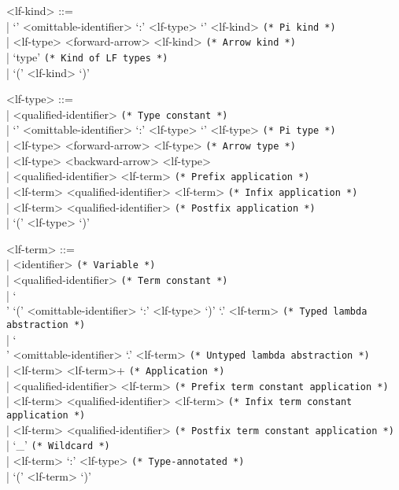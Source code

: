 \documentclass[11pt]{article}
\begin{document}
\begin{grammar}
<lf-kind> ::= \hfill\\
| `{' <omittable-identifier> `:' <lf-type> `}' <lf-kind> \hfill \texttt{(* Pi kind *)}\\
| <lf-type> <forward-arrow> <lf-kind> \hfill \texttt{(* Arrow kind *)}\\
| `type' \hfill \texttt{(* Kind of LF types *)}\\
| `(' <lf-kind> `)'

<lf-type> ::= \hfill\\
| <qualified-identifier> \hfill \texttt{(* Type constant *)}\\
| `{' <omittable-identifier> `:' <lf-type> `}' <lf-type> \hfill \texttt{(* Pi type *)}\\
| <lf-type> <forward-arrow> <lf-type> \hfill \texttt{(* Arrow type *)}\\
| <lf-type> <backward-arrow> <lf-type>\\
| <qualified-identifier> <lf-term> \hfill \texttt{(* Prefix application *)}\\
| <lf-term> <qualified-identifier> <lf-term> \hfill \texttt{(* Infix application *)}\\
| <lf-term> <qualified-identifier> \hfill \texttt{(* Postfix application *)}\\
| `(' <lf-type> `)'

<lf-term> ::= \hfill\\
| <identifier> \hfill \texttt{(* Variable *)}\\
| <qualified-identifier> \hfill \texttt{(* Term constant *)}\\
| `\\' `(' <omittable-identifier> `:' <lf-type> `)' `.' <lf-term> \hfill \texttt{(* Typed lambda abstraction *)}\\
| `\\' <omittable-identifier> `.' <lf-term> \hfill \texttt{(* Untyped lambda abstraction *)}\\
| <lf-term> <lf-term>+ \hfill \texttt{(* Application *)}\\
| <qualified-identifier> <lf-term> \hfill \texttt{(* Prefix term constant application *)}\\
| <lf-term> <qualified-identifier> <lf-term> \hfill \texttt{(* Infix term constant application *)}\\
| <lf-term> <qualified-identifier> \hfill \texttt{(* Postfix term constant application *)}\\
| `_' \hfill \texttt{(* Wildcard *)}\\
| <lf-term> `:' <lf-type> \hfill \texttt{(* Type-annotated *)}\\
| `(' <lf-term> `)'
\end{grammar}
\end{document}
